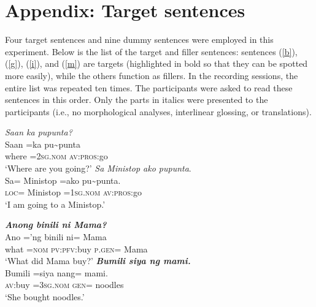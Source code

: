 \documentclass[output=paper]{langsci/langscibook}
\begin{document}
\section*{Appendix: Target sentences}

Four target sentences and nine dummy sentences were employed in this experiment. Below is the list of the target and filler sentences: sentences (\ref{b}), (\ref{g}), (\ref{i}), and (\ref{m}) are targets (highlighted in bold so that they can be spotted more easily), while the others function as fillers. In the recording sessions, the entire list was repeated ten times. The participants were asked to read these sentences in this order. Only the parts in italics were presented to the participants (i.e., no morphological analyses, interlinear glossing, or translations).


\begin{exe}
	\ex\label{a}
	\begin{xlist}
		 \textit{Saan ka pupunta?}\\
		\gll Saan  =ka    pu{\textasciitilde}punta{\USQMark}\\
		where  =\textsc{2sg}.\textsc{nom}  \textsc{av}:\textsc{pros}:go\\
		\glt ‘Where are you going?’
		  {\textit{Sa Ministop ako pupunta}.}\\
		\gll Sa=  Ministop  =ako    pu{\textasciitilde}punta.\\
		\textsc{loc}=  Ministop  =\textsc{1sg}.\textsc{nom}  \textsc{av}:\textsc{pros}:go\\
		\glt ‘I am going to a Ministop.’
	\end{xlist}
\end{exe}

\begin{exe}
	\ex\label{b}
	\begin{xlist}
		 \textit{\textbf{Anong binili ni Mama?}}\\
		\gll Ano  =’ng  b{\USSmaller}in{\USGreater}ili  ni=  Mama{\USQMark}\\
		what  =\textsc{nom} \textsc{pv}:\textsc{pfv}:buy  \textsc{p}.\textsc{gen}= Mama\\
		\glt ‘What did Mama buy?’
		 \textit{\textbf{Bumili siya ng mami.}}\\
		\gll B{\USSmaller}um{\USGreater}ili  =siya    nang=  mami.\\
		\textsc{av}:buy  =\textsc{3sg}.\textsc{nom} \textsc{gen}=  noodles\\
		\glt ‘She bought noodles.’
	\end{xlist}
\end{exe}
\end{document}
